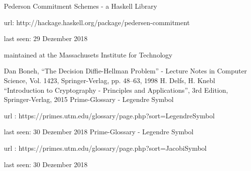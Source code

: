 \begin{thebibliography}{00}
	 Pederson Commitment Schemes - a Haskell Library 
	
	url: http://hackage.haskell.org/package/pedersen-commitment 
	
	last seen: 29 Dezember 2018 
	
	maintained at the Massachusets Institute for Technology
	
	 Dan Boneh, ``The Decision Diffie-Hellman Problem'' - Lecture Notes in Computer Science, Vol. 1423, Springer-Verlag, pp. 48--63, 1998 
	 H. Delfs, H. Knebl ``Introduction to Cryptography - Principles and Applications'', 3rd Edition, Springer-Verlag, 2015
	 Prime-Glossary - Legendre Symbol

	url : https://primes.utm.edu/glossary/page.php?sort=LegendreSymbol
	
	last seen: 30 Dezember 2018
	 Prime-Glossary - Legendre Symbol
	
	url : https://primes.utm.edu/glossary/page.php?sort=JacobiSymbol
	
	last seen: 30 Dezember 2018
\end{thebibliography}
\vspace{12pt}